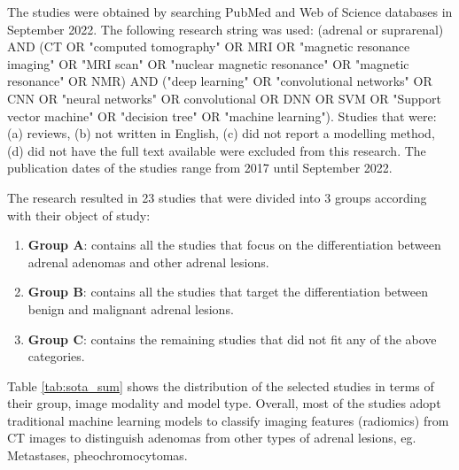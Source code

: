 \documentclass[11pt]{article}
\begin{document}
The studies were obtained by searching PubMed and Web of Science databases in
September 2022. The following research string was used: (adrenal
or suprarenal) AND (CT OR "computed tomography" OR MRI OR "magnetic resonance
imaging" OR "MRI scan" OR "nuclear magnetic resonance" OR "magnetic resonance"
OR NMR) AND ("deep learning" OR "convolutional networks" OR CNN OR "neural
networks" OR convolutional OR DNN OR SVM OR "Support vector machine" OR
"decision tree" OR "machine learning"). Studies that were: (a) reviews, (b) not
written in English, (c) did not report a modelling method, (d) did not have the
full text available were excluded from this research. The publication dates of
the studies range from 2017 until September 2022.

The research resulted in 23 studies that were divided into 3 groups according with
their object of study:
\begin{enumerate}
    \item[] \textbf{Group A}: contains all the studies that focus on the
        differentiation between adrenal adenomas and other adrenal lesions.
    \item[] \textbf{Group B}: contains all the studies that target the
        differentiation between benign and malignant adrenal lesions.
    \item[] \textbf{Group C}: contains the remaining studies that did not fit
        any of the above categories.
\end{enumerate}
Table \ref{tab:sota_sum} shows the distribution of the selected studies in terms
of their group, image modality and model type. Overall, most of the studies
adopt traditional machine learning models to classify imaging features
(radiomics) from CT images to distinguish adenomas from other types of adrenal
lesions, eg. Metastases, pheochromocytomas.
\end{document}
